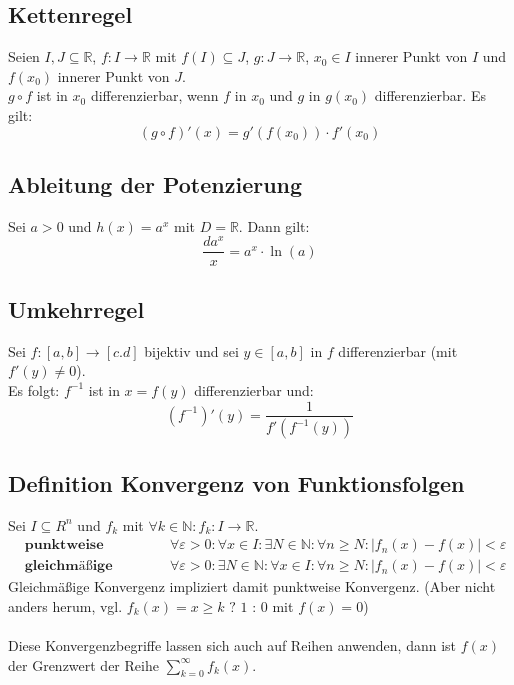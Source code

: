 \documentclass[halfparscip]{scrartcl}
\newcounter{subsection2}
\begin{document}
\subsection{Kettenregel}
Seien $I, J \subseteq \mathbb{R}$, $f: I \rightarrow \mathbb{R}$ mit $f(I) \subseteq J$, $g: J \rightarrow \mathbb{R}$, $x_0 \in I$ innerer Punkt von $I$ und $f(x_0)$ innerer Punkt von $J$.\\
$g \circ f$ ist in $x_0$ differenzierbar, wenn $f$ in $x_0$ und $g$ in $g(x_0)$ differenzierbar. Es gilt:
\begin{equation*}
	(g \circ f)'(x) = g'(f(x_0)) \cdot f'(x_0)
\end{equation*}

\subsection{Ableitung der Potenzierung}
Sei $a > 0$ und $h(x) = a^x$ mit $D = \mathbb{R}$. Dann gilt:
\begin{equation*}
	\frac{da^x}{x}=a^x\cdot \ln(a)
\end{equation*}

\addtocounter{subsection}{2}
\subsection{Umkehrregel}
Sei $f: [a,b] \rightarrow [c.d]$ bijektiv und sei $y \in [a,b]$ in $f$ differenzierbar (mit $f'(y) \neq 0$).\\
Es folgt: $f^{-1}$ ist in $x = f(y)$ differenzierbar und:
\begin{equation*}
	\left(f^{-1}\right)'(y) = \frac{1}{f'\left(f^{-1}(y)\right)}
\end{equation*}

\addtocounter{subsection}{3}
\subsection{Definition Konvergenz von Funktionsfolgen}
Sei $I \subseteq R^n$ und $f_k$ mit $\forall k \in \mathbb{N}: f_k: I \rightarrow \mathbb{R}$.
\begin{align*}
	&\textbf{punktweise Konvergenz:} & &\forall \varepsilon > 0: \forall x \in I: \exists N \in \mathbb{N} : \forall n \geq N: \vert f_n(x)-f(x)\vert < \varepsilon\\
	&\textbf{gleichmäßige Konvergenz:} & &\forall \varepsilon > 0: \exists N \in \mathbb{N} : \forall x \in I: \forall n \geq N: \vert f_n(x)-f(x)\vert < \varepsilon
\end{align*}
Gleichmäßige Konvergenz impliziert damit punktweise Konvergenz. (Aber nicht anders herum, vgl. $f_k(x) = x \geq k \texttt{ ? } 1 \texttt{ : } 0$ mit $f(x) = 0$) \\\\
Diese Konvergenzbegriffe lassen sich auch auf Reihen anwenden, dann ist $f(x)$ der Grenzwert der Reihe $\sum\limits_{k=0}^\infty f_k(x)$.
\end{document}

